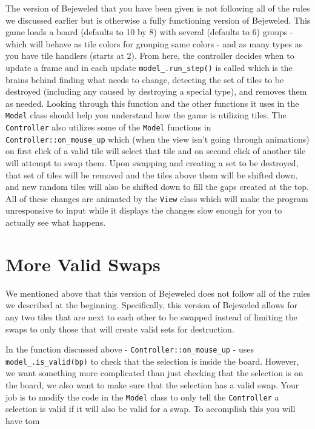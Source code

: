 \documentclass{tufte-handout}
\begin{document}
The version of Bejeweled that you have been given is not following all
of the rules we discussed earlier but is otherwise a fully functioning
version of Bejeweled. This game loads a board (defaults to 10 by 8) with
several (defaults to 6) groups - which will behave as tile colors for
grouping same colors - and as many types as you have tile handlers (starts
at 2). From here, the controller decides when to update a frame and in each
update \verb!model_.run_step()! is called which is the brains behind
finding what needs to change, detecting the set of tiles to be destroyed
(including any caused by destroying a special type), and removes them as
needed. Looking through this function and the other functions it uses in
the \verb^Model^ class should help you understand how the game is utilizing
tiles. The \verb^Controller^ also utilizes some of the \verb^Model^ functions
in \verb!Controller::on_mouse_up! which (when the view isn't going through
animations) on first click of a valid tile will select that tile and on
second click of another tile will attempt to swap them. Upon swapping and
creating a set to be destroyed, that set of tiles will be removed and the
tiles above them will be shifted down, and new random tiles will also be
shifted down to fill the gaps created at the top. All of these changes are
animated by the \verb^View^ class which will make the program unresponsive to
input while it displays the changes slow enough for you to actually see what
happens.

\section{More Valid Swaps}

We mentioned above that this version of Bejeweled does not follow all of the
rules we described at the beginning. Specifically, this version of Bejeweled
allows for any two tiles that are next to each other to be swapped instead of
limiting the swaps to only those that will create valid sets for destruction.

In  the function discussed above -
\verb!Controller::on_mouse_up! - uses \verb!model_.is_valid(bp)! to check that
the selection is inside the board. However, we want something more complicated
than just checking that the selection is on the board, we also want to make
sure that the selection has a valid swap. Your job is to modify the code in the
\verb^Model^ class to only tell the \verb^Controller^ a selection is valid if
it will also be valid for a swap. To accomplish this you will have tom
\end{document}
